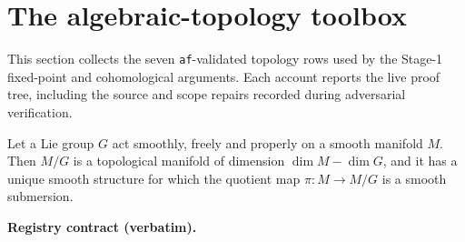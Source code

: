 \section{The algebraic-topology toolbox}\label{sec:topology-toolbox}

This section collects the seven \texttt{af}-validated topology rows used by the
Stage-1 fixed-point and cohomological arguments.  Each account reports the live proof
tree, including the source and scope repairs recorded during adversarial verification.

\begin{lemma}\label{lem:topology-quotient-manifold}
Let a Lie group $G$ act smoothly, freely and properly on a smooth manifold $M$.
Then $M/G$ is a topological manifold of dimension $\dim M-\dim G$, and it has a
unique smooth structure for which the quotient map $\pi:M\to M/G$ is a smooth
submersion.
\end{lemma}

\noindent\textbf{Registry contract (verbatim).}

